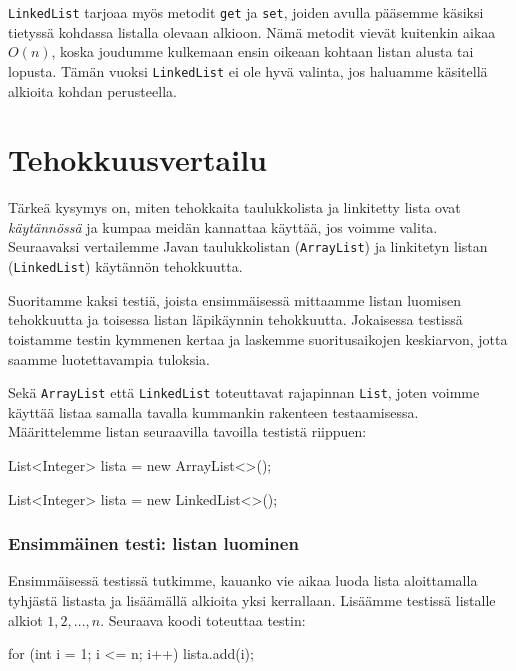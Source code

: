 \texttt{LinkedList} tarjoaa myös metodit
\texttt{get} ja \texttt{set}, joiden avulla
pääsemme käsiksi tietyssä kohdassa listalla olevaan alkioon.
Nämä metodit vievät kuitenkin aikaa $O(n)$,
koska joudumme kulkemaan ensin oikeaan kohtaan listan
alusta tai lopusta.
Tämän vuoksi \texttt{LinkedList} ei ole hyvä valinta,
jos haluamme käsitellä alkioita kohdan perusteella.

\section{Tehokkuusvertailu}

Tärkeä kysymys on, miten tehokkaita taulukkolista ja
linkitetty lista ovat \emph{käytännössä} ja kumpaa meidän
kannattaa käyttää, jos voimme valita.
Seuraavaksi vertailemme Javan taulukkolistan
(\texttt{ArrayList}) ja linkitetyn listan (\texttt{LinkedList})
käytännön tehokkuutta.

Suoritamme kaksi testiä, joista ensimmäisessä mittaamme
listan luomisen tehokkuutta ja toisessa listan läpikäynnin tehokkuutta.
Jokaisessa testissä toistamme testin kymmenen kertaa ja laskemme
suoritusaikojen keskiarvon, jotta saamme luotettavampia tuloksia.

Sekä \texttt{ArrayList} että \texttt{LinkedList}
toteuttavat rajapinnan \texttt{List},
joten voimme käyttää listaa samalla tavalla kummankin
rakenteen testaamisessa.
Määrittelemme listan seuraavilla tavoilla testistä riippuen:

\begin{code}
List<Integer> lista = new ArrayList<>();
\end{code}

\begin{code}
List<Integer> lista = new LinkedList<>();
\end{code}

\subsubsection{Ensimmäinen testi: listan luominen}

Ensimmäisessä testissä tutkimme, kauanko vie aikaa luoda lista
aloittamalla tyhjästä listasta ja lisäämällä alkioita yksi kerrallaan.
Lisäämme testissä listalle alkiot $1,2,\dots,n$.
Seuraava koodi toteuttaa testin:

\begin{code}
for (int i = 1; i <= n; i++) {
    lista.add(i);
}
\end{code}

